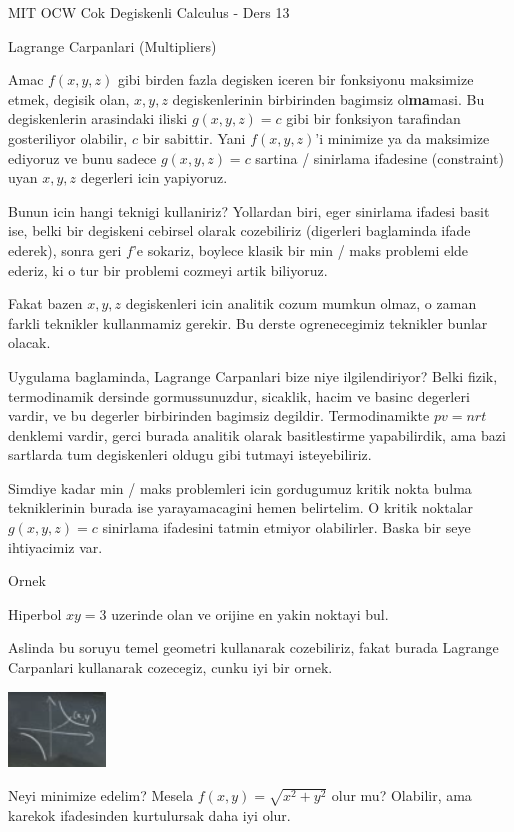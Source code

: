 \documentclass[12pt,fleqn]{article}
\begin{document}
MIT OCW Cok Degiskenli Calculus - Ders 13

Lagrange Carpanlari (Multipliers)

Amac $f(x,y,z)$ gibi birden fazla degisken iceren bir fonksiyonu maksimize
etmek, degisik olan, $x,y,z$ degiskenlerinin birbirinden bagimsiz
ol\textbf{ma}masi. Bu degiskenlerin arasindaki iliski $g(x,y,z)=c$ gibi bir
fonksiyon tarafindan gosteriliyor olabilir, $c$ bir sabittir. Yani
$f(x,y,z)$'i minimize ya da maksimize ediyoruz ve bunu sadece $g(x,y,z)=c$
sartina / sinirlama ifadesine (constraint) uyan $x,y,z$ degerleri icin yapiyoruz.

Bunun icin hangi teknigi kullaniriz? Yollardan biri, eger sinirlama ifadesi
basit ise, belki bir degiskeni cebirsel olarak cozebiliriz (digerleri
baglaminda ifade ederek), sonra geri $f$'e sokariz, boylece klasik bir min
/ maks problemi elde ederiz, ki o tur bir problemi cozmeyi artik biliyoruz.

Fakat bazen $x,y,z$ degiskenleri icin analitik cozum mumkun olmaz, o zaman
farkli teknikler kullanmamiz gerekir. Bu derste ogrenecegimiz teknikler
bunlar olacak. 

Uygulama baglaminda, Lagrange Carpanlari bize niye ilgilendiriyor? Belki
fizik, termodinamik dersinde gormussunuzdur, sicaklik, hacim ve basinc
degerleri vardir, ve bu degerler birbirinden bagimsiz
degildir. Termodinamikte $pv = nrt$ denklemi vardir, gerci burada analitik
olarak basitlestirme yapabilirdik, ama bazi sartlarda tum degiskenleri
oldugu gibi tutmayi isteyebiliriz. 

Simdiye kadar min / maks problemleri icin gordugumuz kritik nokta bulma
tekniklerinin burada ise yarayamacagini hemen belirtelim. O kritik noktalar
$g(x,y,z)=c$ sinirlama ifadesini tatmin etmiyor olabilirler. Baska bir seye
ihtiyacimiz var. 

Ornek

Hiperbol $xy =3$ uzerinde olan ve orijine en yakin noktayi bul. 

Aslinda bu soruyu temel geometri kullanarak cozebiliriz, fakat burada
Lagrange Carpanlari kullanarak cozecegiz, cunku iyi bir ornek. 

\includegraphics[height=2cm]{13_1.png}

Neyi minimize edelim? Mesela $f(x,y) = \sqrt{x^2 + y^2}$ olur mu? Olabilir,
ama karekok ifadesinden kurtulursak daha iyi olur. 
\end{document}
